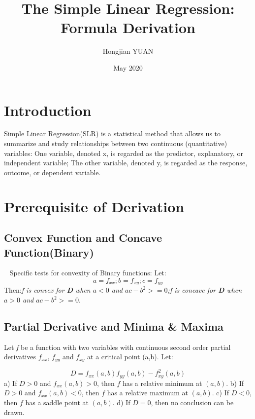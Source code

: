 \documentclass{article}
\title{\textbf{The Simple Linear Regression: Formula Derivation}}
\author{Hongjian YUAN}
\date{May 2020}
\begin{document}
\maketitle
\section{Introduction}
Simple Linear Regression(SLR) is a statistical method that allows us to summarize and study relationships between two continuous (quantitative) variables: One variable, denoted x, is regarded as the predictor, explanatory, or independent variable; The other variable, denoted y, is regarded as the response, outcome, or dependent variable. ~\cite{online.stat.psu.edu}
\section{Prerequisite of Derivation}

\subsection{Convex Function and Concave Function(Binary)} ~\cite{kaplan2011maxima}
Specific tests for convexity of Binary functions:
Let:
\begin{equation}
a = f_{xx}; b =f_{xy}; c = f_{yy}
\end{equation}
Then:\newline \textit{f is convex for \textbf{D} when $ a < 0 $ and $ac-b^2 >= 0 $;\newline f is concave for \textbf{D }when \( a > 0\) and $ ac-b^2 >=0 $}.\
\subsection{Partial Derivative and Minima \& Maxima}
Let \textit{f} be a function with two variables with continuous second order partial derivatives $  f_{xx} $, $ f_{yy} $ and $ f_{xy}$ at a critical point (a,b). Let:

\begin{equation}
D = f_{xx}(a,b) f_{yy}(a,b) - f_{xy}^{2}(a,b)
\end{equation}
a) If $ D > 0 $ and $ f_{xx} (a,b) > 0 $, then $ f $ has a relative minimum at $(a,b)$.\newline
b) If $ D > 0$ and $f_{xx} (a,b) < 0$, then $f$ has a relative maximum at $(a,b)$.\newline 
c) If $D < 0$, then $f$ has a saddle point at $(a,b)$.\newline
d) If $D = 0$, then no conclusion can be drawn.
\end{document}
